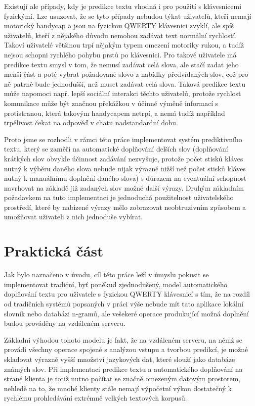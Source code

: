 \documentclass[a4paper,11pt]{article}
\begin{document}
Existují ale případy, kdy je predikce textu vhodná i pro použití s klávesnicemi fyzickými. Lze usuzovat, že se tyto případy nebudou týkat uživatelů, kteří nemají motorický handycap a jsou na fyzickou QWERTY klávesnici zvyklí, ale spíš uživatelů, kteří z nějakého důvodu nemohou zadávat text normální rychlostí. Takoví uživatelé většinou trpí nějakým typem omezení motoriky rukou, a tudíž nejsou schopni rychlého pohybu prstů po klávesnici. Pro takové uživatele má predikce textu smysl v tom, že nemusí zadávat celá slova, ale stačí zadat jeho menší část a poté vybrat požadované slovo z nabídky předvídaných slov, což pro ně patrně bude jednodušší, než muset zadávat celá slova. Taková predikce textu může napomoci např. lepší sociální interakci těchto uživatelů, protože rychlost komunikace může být značnou překážkou v účinné výměně informací s protistranou, která takovým handycapem netrpí, a nemá tudíž například trpělivost čekat na odpověď v chatu nadstandardní dobu. %


Proto jsme se rozhodli v rámci této práce implementovat systém prediktivního textu, který se zaměří na automatické doplňování delších slov (doplňování krátkých slov obvykle účinnost zadávání nezvyšuje, protože počet stisků kláves nutný k výběru daného slova nebude nijak výrazně nižší než počet stisků kláves nutný k manuálnímu doplnění daného slova) s důrazem na eventuální schopnost navrhovat na základě již zadaných slov možné další výrazy. Druhým základním požadavkem na tuto implementaci je jednoduchá použitelnost uživatelského prostředí, které by nabízené výrazy mělo zobrazovat neobtruzivním způsobem a umožňovat uživateli z nich jednoduše vybírat.

\part{Praktická část}

Jak bylo naznačeno v úvodu, cíl této práce leží v úmyslu pokusit se implementovat tradiční, byť poněkud zjednodušený, model automatického doplňování textu pro uživatele s fyzickou QWERTY klávesnicí s tím, že na rozdíl od tradičních systémů popsaných v práci výše nebude mít tato aplikace lokální slovník nebo databázi n-gramů, ale vešekeré operace produkující možná doplnění budou prováděny na vzdáleném serveru.

Základní výhodou tohoto modelu je fakt, že na vzdáleném serveru, na němž se provádí všechny operace spojené s analýzou vstupu a tvorbou predikcí, je možné skladovat výrazně vyšší množství jazykových dat, které slouží jako databáze známých slov. Při implementaci predikce textu a automatického doplňování na straně klienta je totiž nutno počítat se značně omezeným datovým prostorem, nehledě na to, že mnohé klienty stále nemají výpočetní výkon dostatečný k rychlému prohledávání extrémně velkých textových korpusů.
\end{document}
